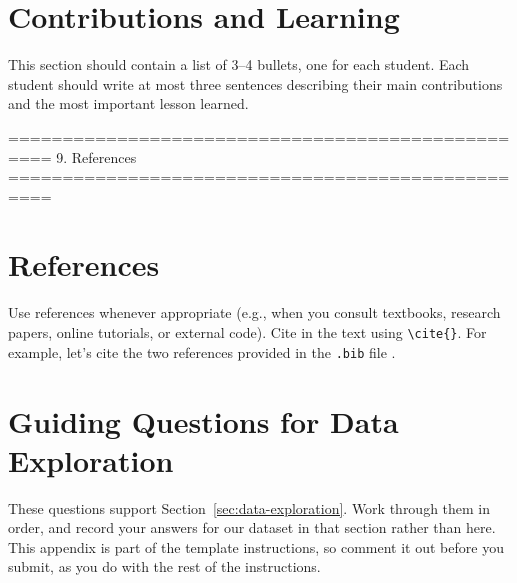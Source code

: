 \documentclass[12pt]{article}
\begin{document}
\section{Contributions and Learning}

This section should contain a list of 3–4 bullets, one for each student. Each student
should write at most three sentences describing their main contributions and the most
important lesson learned.

==================================================
9. References
==================================================
\section{References}

Use references whenever appropriate (e.g., when you consult textbooks, research papers,
online tutorials, or external code). Cite in the text using \verb|\cite{}|. For example,
let's cite the two references provided in the \texttt{.bib} file
\cite{bishop2006prml,hastie2009esl}.




\newpage
\appendix
\section{Guiding Questions for Data Exploration}\label{app:data-exploration}

These questions support Section~\ref{sec:data-exploration}. Work through them in order,
and record your answers for our dataset in that section rather than here. This appendix
is part of the template instructions, so comment it out before you submit, as you do
with the rest of the instructions.

%
%
%
\end{document}
